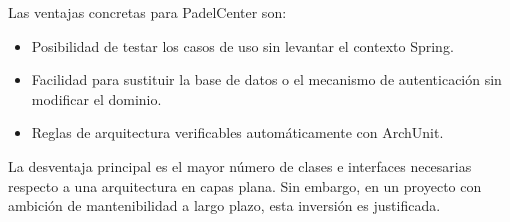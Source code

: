 Las ventajas concretas para PadelCenter son:
\begin{itemize}
  \item Posibilidad de testar los casos de uso sin levantar el contexto Spring.
  \item Facilidad para sustituir la base de datos o el mecanismo de autenticación
        sin modificar el dominio.
  \item Reglas de arquitectura verificables automáticamente con ArchUnit.
\end{itemize}

La desventaja principal es el mayor número de clases e interfaces necesarias
respecto a una arquitectura en capas plana. Sin embargo, en un proyecto con
ambición de mantenibilidad a largo plazo, esta inversión es justificada.
